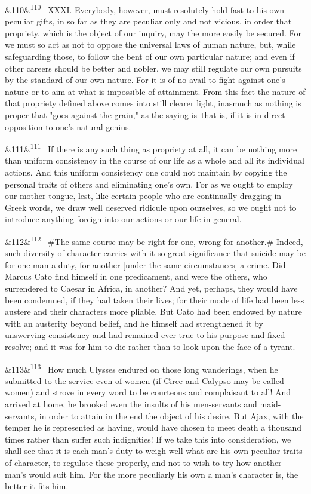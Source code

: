 \documentclass[12pt]{article}
\newcommand{\para}[1][]{\par\noindent\ifx&#1&\else\textsuperscript{\footnotesize #1}~\fi}
\begin{document}
\para[110] XXXI. Everybody, however, must resolutely hold fast to his own peculiar gifts, in so far as they are peculiar only and not vicious, in order that propriety, which is the object of our inquiry, may the more easily be secured. For we must so act as not to oppose the universal laws of human nature, but, while safeguarding those, to follow the bent of our own particular nature; and even if other careers should be better and nobler, we may still regulate our own pursuits by the standard of our own nature. For it is of no avail to fight against one's nature or to aim at what is impossible of attainment. From this fact the nature of that propriety defined above comes into still clearer light, inasmuch as nothing is proper that "goes against the grain," as the saying is--that is, if it is in direct opposition to one's natural genius.

\para[111] If there is any such thing as propriety at all, it can be nothing more than uniform consistency in the course of our life as a whole and all its individual actions. And this uniform consistency one could not maintain by copying the personal traits of others and eliminating one's own. For as we ought to employ our mother-tongue, lest, like certain people who are continually dragging in Greek words, we draw well deserved ridicule upon ourselves, so we ought not to introduce anything foreign into our actions or our life in general.

\para[112] \#The same course may be right for one, wrong for another.\# Indeed, such diversity of character carries with it so great significance that suicide may be for one man a duty, for another [under the same circumstances] a crime. Did Marcus Cato find himself in one predicament, and were the others, who surrendered to Caesar in Africa, in another? And yet, perhaps, they would have been condemned, if they had taken their lives; for their mode of life had been less austere and their characters more pliable. But Cato had been endowed by nature with an austerity beyond belief, and he himself had strengthened it by unswerving consistency and had remained ever true to his purpose and fixed resolve; and it was for him to die rather than to look upon the face of a tyrant.

\para[113] How much Ulysses endured on those long wanderings, when he submitted to the service even of women (if Circe and Calypso may be called women) and strove in every word to be courteous and complaisant to all! And arrived at home, he brooked even the insults of his men-servants and maid-servants, in order to attain in the end the object of his desire. But Ajax, with the temper he is represented as having, would have chosen to meet death a thousand times rather than suffer such indignities! If we take this into consideration, we shall see that it is each man's duty to weigh well what are his own peculiar traits of character, to regulate these properly, and not to wish to try how another man's would suit him. For the more peculiarly his own a man's character is, the better it fits him.
\end{document}
